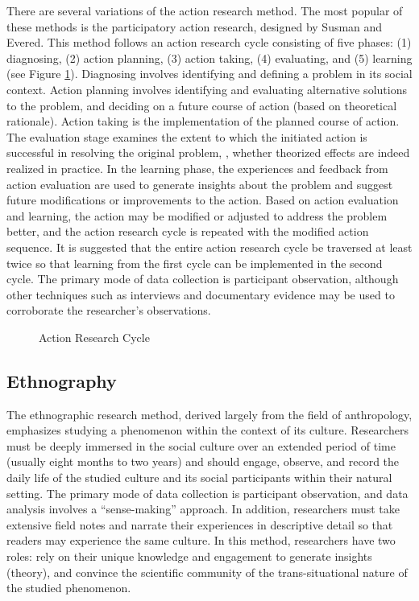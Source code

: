 There are several variations of the action research method. The most popular of these methods is the participatory action research, designed by Susman and Evered\cite{evered1978assessment}. This method follows an action research cycle consisting of five phases: (1) diagnosing, (2) action planning, (3) action taking, (4) evaluating, and (5) learning (see Figure \ref{13:fig01}). Diagnosing involves identifying and defining a problem in its social context. Action planning involves identifying and evaluating alternative solutions to the problem, and deciding on a future course of action (based on theoretical rationale). Action taking is the implementation of the planned course of action. The evaluation stage examines the extent to which the initiated action is successful in resolving the original problem, \ie, whether theorized effects are indeed realized in practice. In the learning phase, the experiences and feedback from action evaluation are used to generate insights about the problem and suggest future modifications or improvements to the action. Based on action evaluation and learning, the action may be modified or adjusted to address the problem better, and the action research cycle is repeated with the modified action sequence. It is suggested that the entire action research cycle be traversed at least twice so that learning from the first cycle can be implemented in the second cycle. The primary mode of data collection is participant observation, although other techniques such as interviews and documentary evidence may be used to corroborate the researcher's observations.

\begin{figure}[H]
	\centering
	\caption{Action Research Cycle}
	\label{13:fig01}
\end{figure}

\subsection{Ethnography}

The ethnographic research method, derived largely from the field of anthropology, emphasizes studying a phenomenon within the context of its culture. Researchers must be deeply immersed in the social culture over an extended period of time (usually eight months to two years) and should engage, observe, and record the daily life of the studied culture and its social participants within their natural setting. The primary mode of data collection is participant observation, and data analysis involves a ``sense-making'' approach. In addition, researchers must take extensive field notes and narrate their experiences in descriptive detail so that readers may experience the same culture. In this method, researchers have two roles: rely on their unique knowledge and engagement to generate insights (theory), and convince the scientific community of the trans-situational nature of the studied phenomenon.

